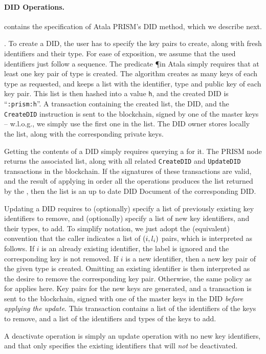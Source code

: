 \paragraph{DID Operations.} %
 contains the specification of Atala PRISM's DID method,
which we describe next.

\begin{description}
\item{.} %
  To create a DID, the user has to specify the key pairs to create, along with
  fresh identifiers and their type. For ease of exposition, we assume that the
  used identifiers just follow a sequence. The predicate \P in Atala simply
  requires that at least one key pair of \MasterKey type is created. The
   algorithm creates as many keys of each type as requested,
  and keeps a list with the identifier, type and public key of each key pair.
  This list is then hashed into a value \texttt{h}, and the created DID is
  ``\texttt{\did:prism:h}''. A transaction containing the created list, the
  DID, and the \texttt{CreateDID} instruction is sent to the blockchain,
  signed by one of the master keys -- w.l.o.g., we simply use the first one
  in the list. The DID owner stores locally the list, along with the
  corresponding private keys.
\item[\uccmd{Read}.] %
  Getting the contents of a DID simply requires querying a  for
  it. The PRISM node returns the associated list, along with all related
  \texttt{CreateDID} and \texttt{UpdateDID} transactions in the blockchain. If
  the signatures of these transactions are valid, and the result of applying in
  order all the operations produces the list returned by the ,
  then the list is an up to date DID Document of the corresponding DID.
\item[\uccmd{Update}.] %
  Updating a DID requires to (optionally) specify a list of previously existing
  key identifiers to remove, and (optionally) specify a list of new key
  identifiers, and their types, to add. To simplify notation, we just adopt the
  (equivalent) convention that the caller indicates a list of $(i,l_i)$
  pairs, which is interpreted as follows. If $i$ is an already existing
  identifier, the label is ignored and the corresponding key is not removed. If
  $i$ is a new identifier, then a new key pair of the given type is created.
  Omitting an existing identifier is then interpreted as the desire to remove
  the corresponding key pair. Otherwise, the same policy as for 
  applies here. Key pairs for the new keys are generated, and a transaction is
  sent to the blockchain, signed with one of the master keys in the DID
  \emph{before applying the update}. This transaction contains a list of the
  identifiers of the keys to remove, and a list of the identifiers and types
  of the keys to add.
\item[\uccmd{Deactivate}.] %
  A deactivate operation is simply an update operation with no new key
  identifiers, and that only specifies the existing identifiers that will
  \emph{not} be deactivated.
\end{description}

